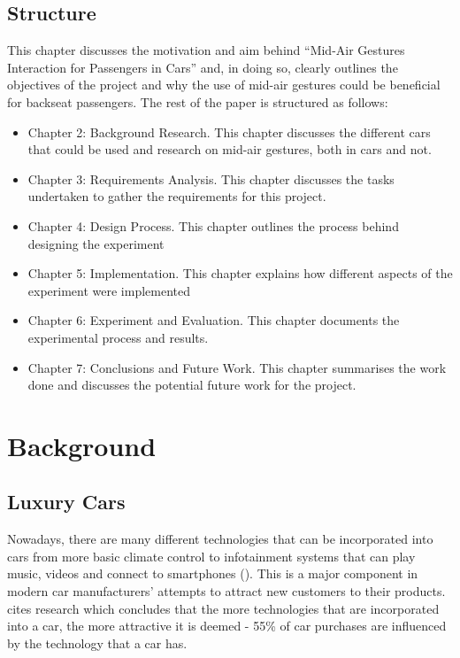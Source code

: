 \documentclass{l4proj}
\begin{document}
\section{Structure}
This chapter discusses the motivation and aim behind “Mid-Air Gestures Interaction for Passengers in Cars” and, in doing so, clearly outlines the objectives of the project and why the use of mid-air gestures could be beneficial for backseat passengers. The rest of the paper is structured as follows:
\begin{itemize}
\item Chapter 2: Background Research. This chapter discusses the different cars that could be used and research on mid-air gestures, both in cars and not.
\item Chapter 3: Requirements Analysis. This chapter discusses the tasks undertaken to gather the requirements for this project.
\item Chapter 4: Design Process. This chapter outlines the process behind designing the experiment
\item Chapter 5: Implementation. This chapter explains how different aspects of the experiment were implemented
\item Chapter 6: Experiment and Evaluation. This chapter documents the experimental process and results.
\item Chapter 7: Conclusions and Future Work. This chapter summarises the work done and discusses the potential future work for the project.
\end{itemize}



\chapter{Background}

\section{Luxury Cars}
\label{section:luxuryCars}
Nowadays, there are many different technologies that can be incorporated into cars from more basic climate control to infotainment systems that can play music, videos and connect to smartphones (\cite{Svangren_Skov_Kjeldskov_2017}). This is a major component in modern car manufacturers' attempts to attract new customers to their products. \cite{Christou_2019} cites research which concludes that the more technologies that are incorporated into a car, the more attractive it is deemed - 55\% of car purchases are influenced by the technology that a car has.
\end{document}
